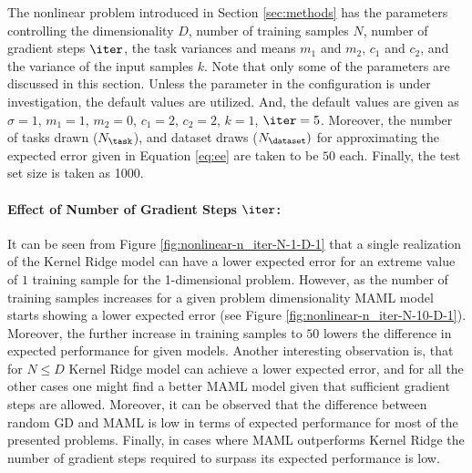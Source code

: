The nonlinear problem introduced in Section \ref{sec:methods} has the parameters controlling the dimensionality $D$, number of training samples $N$, number of gradient steps $\iter$, the task variances and means $m_1$ and $m_2$, $c_1$ and $c_2$, and the variance of the input samples $k$. Note that only some of the parameters are discussed in this section. Unless the parameter in the configuration is under investigation, the default values are utilized. And, the default values are given as $\sigma=1$, $m_1=1$, $m_2=0$, $c_1=2$, $c_2=2$, $k=1$, $\iter=5$. Moreover, the number of tasks drawn ($N_{\task}$), and dataset draws ($N_{\dataset})$  for approximating the expected error given in Equation \ref{eq:ee} are taken to be $50$ each. Finally, the test set size is taken as 1000.

\paragraph{Effect of Number of Gradient Steps $\iter$:} It can be seen from Figure \ref{fig:nonlinear-n_iter-N-1-D-1} that a single realization of the Kernel Ridge model can have a lower expected error for an extreme value of $1$ training sample for the 1-dimensional problem. However, as the number of training samples increases for a given problem dimensionality MAML model starts showing a lower expected error (see Figure \ref{fig:nonlinear-n_iter-N-10-D-1}). Moreover, the further increase in training samples to $50$ lowers the difference in expected performance for given models. Another interesting observation is, that for $N\leq D$ Kernel Ridge model can achieve a lower expected error, and for all the other cases one might find a better MAML model given that sufficient gradient steps are allowed. Moreover, it can be observed that the difference between random GD and MAML is low in terms of expected performance for most of the presented problems. Finally, in cases where MAML outperforms Kernel Ridge the number of gradient steps required to surpass its expected performance is low.

